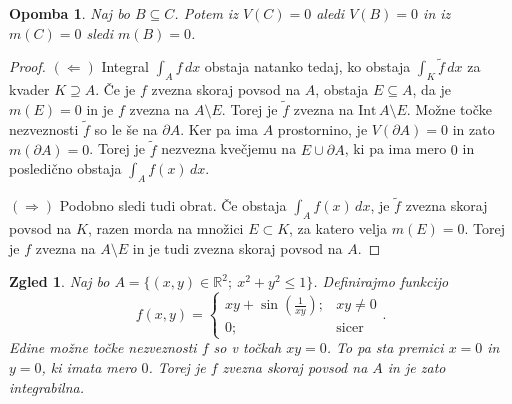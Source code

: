 \documentclass[10pt, a4paper]{article}
\newtheorem*{opomba}{Opomba}
\newtheorem{zgled}{Zgled}[section]
\newenvironment{noticeC}{%
  \tcolorbox[%
  notitle,
  empty,
  enhanced,  %
  breakable,
  coltext=black, 
  fontupper=\rmfamily,
  parbox=false,
  noparskip,
  sharp corners,
  boxrule=-1pt,  %
  frame hidden,
  left=7pt,  %
  right=7pt,
  top=5pt,
  bottom=5pt,
  before skip=2.5ex plus 2pt,
  after skip=2.5ex plus 2pt,
  overlay unbroken and last={%
  },
  ]}
{\endtcolorbox}
\newenvironment{dokaz}%
  {\begin{noticeC}\begin{proof}}%
  {\end{proof}\end{noticeC}}
\newcommand{\R}{\mathbb {R}}
\newcommand{\inte}{\mathrm{Int}}
\begin{document}
\begin{opomba}
    Naj bo $B \subseteq C$.
    Potem iz $V(C) = 0$ aledi $V(B) = 0$
    in iz $m (C) = 0$ sledi $m(B) = 0$.
\end{opomba}

\begin{dokaz}
    $(\Leftarrow)$ Integral $\int_A f\, dx$ obstaja natanko tedaj, ko obstaja
    $\int_K \widetilde{f}\, dx$ za kvader $K \supseteq A$.
    Če je $f$ zvezna skoraj povsod na $A$, obstaja $E \subseteq A$,
    da je $m(E) = 0$ in je $f$ zvezna na $A \setminus E$.
    Torej je $\widetilde{f}$ zvezna na $\inte\, A \setminus E$.
    Možne točke nezveznosti $\widetilde{f}$ so le še na $\partial A$.
    Ker pa ima $A$ prostornino, je $V (\partial A) = 0$ in zato $m (\partial A) = 0$.
    Torej je $\widetilde{f}$ nezvezna kvečjemu na $E \cup \partial A$, ki pa ima mero $0$ in 
    posledično obstaja $\int_A f(x)\, dx$.

    $(\Rightarrow)$ Podobno sledi tudi obrat. Če obstaja $\int_A f(x)\, dx$, je $\widetilde{f}$ zvezna skoraj povsod na $K$,
    razen morda na množici $E \subset K$, za katero velja $m (E) = 0$.
    Torej je $f$ zvezna na $A \setminus E$ in je tudi zvezna skoraj povsod na $A$.
\end{dokaz}

\begin{zgled}
    Naj bo $A = \{(x, y) \in \R^2;\ x^2 + y^2 \leq 1\}$.
    Definirajmo funkcijo $$f(x, y) = \begin{cases}
        xy + \sin \left(\frac{1}{xy}\right);& xy \neq 0\\
        0;& \mathrm{sicer}
    \end{cases}.$$
    Edine možne točke nezveznosti $f$ so v točkah $xy = 0$.
    To pa sta premici $x = 0$ in $y = 0$, ki imata mero $0$.
    Torej je $f$ zvezna skoraj povsod na $A$ in je zato integrabilna.
\end{zgled}
\end{document}
